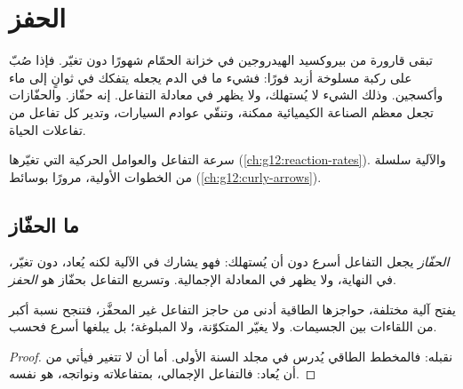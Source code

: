 \chapter{الحفز}\label{ch:g12:catalysis}

تبقى قارورة من  بيروكسيد الهيدروجين في خزانة الحمّام
شهورًا دون تغيّر. فإذا صُبّ على ركبة مسلوخة أزبد فورًا:
فشيء ما في الدم يجعله يتفكك في ثوانٍ إلى ماء
وأكسجين. وذلك الشيء لا يُستهلك، ولا يظهر في
معادلة التفاعل. إنه حفّاز. والحفّازات تجعل معظم
الصناعة الكيميائية ممكنة، وتنقّي عوادم السيارات، وتدير كل
تفاعل من تفاعلات الحياة.

\begin{recall}
سرعة التفاعل والعوامل الحركية التي تغيّرها
(\cref{ch:g12:reaction-rates}). والآلية سلسلة من الخطوات
الأولية، مرورًا بوسائط (\cref{ch:g12:curly-arrows}).
\end{recall}

\section{ما الحفّاز}

\begin{definition}\label{def:g12:catalysis:catalyst}
\emph{الحفّاز}  يجعل التفاعل
أسرع دون أن يُستهلك: فهو يشارك في الآلية لكنه يُعاد،
دون تغيّر، في النهاية، ولا يظهر في المعادلة
الإجمالية. وتسريع التفاعل بحفّاز هو
\emph{الحفز}.
\end{definition}

\begin{proposition}\label{prop:g12:catalysis:path}
يفتح  آلية مختلفة، حواجزها الطاقية أدنى
من حاجز التفاعل غير المحفَّز، فتنجح نسبة أكبر من اللقاءات
بين الجسيمات. ولا يغيّر  المتكوّنة، ولا
 المبلوغة؛ بل يبلغها أسرع فحسب.
\end{proposition}

\begin{proof}
نقبله: فالمخطط الطاقي يُدرس في مجلد السنة الأولى. أما أن  لا تتغير فيأتي من أن  يُعاد: فالتفاعل
الإجمالي، بمتفاعلاته ونواتجه، هو نفسه.
\end{proof}

